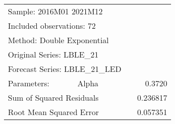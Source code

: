 \begin{tabular}{lrrrr}
\toprule
\multicolumn{3}{l}{Sample: 2016M01 2021M12}&\multicolumn{1}{c}{}&\multicolumn{1}{c}{}\\
\multicolumn{3}{l}{Included observations: 72}&\multicolumn{1}{c}{}&\multicolumn{1}{c}{}\\
\multicolumn{3}{l}{Method: Double Exponential}&\multicolumn{1}{c}{}&\multicolumn{1}{c}{}\\
\multicolumn{3}{l}{Original Series: LBLE\_21}&\multicolumn{1}{c}{}&\multicolumn{1}{c}{}\\
\multicolumn{3}{l}{Forecast Series: LBLE\_21\_LED}&\multicolumn{1}{c}{}&\multicolumn{1}{c}{}\\
\midrule
\multicolumn{1}{l}{Parameters:}&\multicolumn{1}{l}{Alpha}&\multicolumn{1}{c}{}&\multicolumn{1}{c}{}&\multicolumn{1}{r}{0.3720}\\
\multicolumn{3}{l}{Sum of Squared Residuals}&\multicolumn{1}{c}{}&\multicolumn{1}{r}{0.236817}\\
\multicolumn{3}{l}{Root Mean Squared Error}&\multicolumn{1}{c}{}&\multicolumn{1}{r}{0.057351}\\
\bottomrule
\end{tabular}